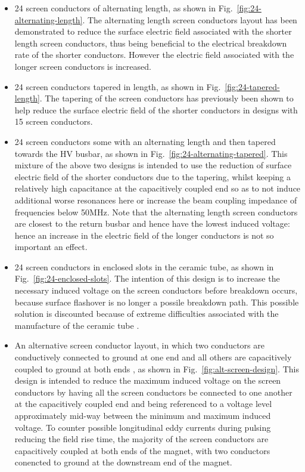 \begin{itemize}
\item{24 screen conductors of alternating length, as shown in Fig.~\ref{fig:24-alternating-length}. The alternating length screen conductors layout has been demonstrated to reduce the surface electric field associated with the shorter length screen conductors, thus being beneficial to the electrical breakdown rate of the shorter conductors. However the electric field associated with the longer screen conductors is increased.}
\item{24 screen conductors tapered in length, as shown in Fig.~\ref{fig:24-tapered-length}. The tapering of the screen conductors has previously been shown to help reduce the surface electric field of the shorter conductors in designs with 15 screen conductors.}
\item{24 screen conductors some with an alternating length and then tapered towards the HV busbar, as shown in Fig.~\ref{fig:24-alternating-tapered}. This mixture of the above two designs is intended to use the reduction of surface electric field of the shorter conductors due to the tapering, whilst keeping a relatively high capacitance at the capacitively coupled end so as to not induce additional worse resonances here or increase the beam coupling impedance of frequencies below 50MHz. Note that the alternating length screen conductors are closest to the return busbar and hence have the lowest induced voltage: hence an increase in the electric field of the longer conductors is not so important an effect.}
\item{24 screen conductors in enclosed slots in the ceramic tube, as shown in Fig.~\ref{fig:24-enclosed-slots}. The intention of this design is to increase the necessary induced voltage on the screen conductors before breakdown occurs, because surface flashover is no longer a possile breakdown path. This possible solution is discounted because of extreme difficulties associated with the manufacture of the ceramic tube \cite{Barnes:8thStratMeet}.}
\item{An alternative screen conductor layout, in which two conductors are conductively connected to ground at one end and all others are capacitively coupled to ground at both ends \cite{Barnes:mkiAlt}, as shown in Fig.~\ref{fig:alt-screen-design}. This design is intended to reduce the maximum induced voltage on the screen conductors by having all the screen conductors be connected to one another at the capacitively coupled end and being referenced to a voltage level approximately mid-way between the minimum and maximum induced voltage. To counter possible longitudinal eddy currents during pulsing reducing the field rise time, the majority of the screen conductors are capacitively coupled at both ends of the magnet, with two conductors conencted to ground at the downstream end of the magnet.}

\end{itemize}
